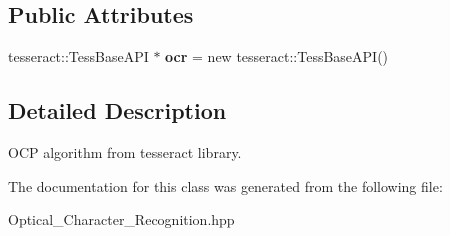 \subsection*{Public Attributes}
\begin{DoxyCompactItemize}
\item 
\mbox{\label{class_image_processing_1_1_optical___character___recognition_a6352d6777c7e6869de7a5840869f7e8e}} 
tesseract\+::\+Tess\+Base\+A\+PI $\ast$ {\bfseries ocr} = new tesseract\+::\+Tess\+Base\+A\+PI()
\end{DoxyCompactItemize}


\subsection{Detailed Description}
O\+CP algorithm from tesseract library. 

The documentation for this class was generated from the following file\+:\begin{DoxyCompactItemize}
\item 
Optical\+\_\+\+Character\+\_\+\+Recognition.\+hpp\end{DoxyCompactItemize}
